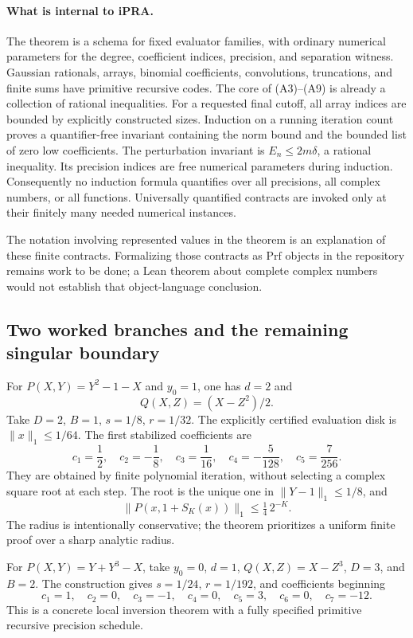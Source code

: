 \paragraph{What is internal to iPRA.}
The theorem is a schema for fixed evaluator families, with ordinary
numerical parameters for the degree, coefficient indices, precision,
and separation witness. Gaussian rationals, arrays, binomial
coefficients, convolutions, truncations, and finite sums have primitive
recursive codes. The core of (A3)--(A9) is already a collection of
rational inequalities. For a requested final cutoff, all array indices
are bounded by explicitly constructed sizes. Induction on a running
iteration count proves a quantifier-free invariant containing the norm
bound and the bounded list of zero low coefficients. The perturbation
invariant is \(E_n\leq2m\delta\), a rational inequality. Its precision
indices are free numerical parameters during induction. Consequently
no induction formula quantifies over all precisions, all complex
numbers, or all functions. Universally quantified contracts are invoked
only at their finitely many needed numerical instances.

The notation involving represented values in the theorem is an
explanation of these finite contracts. Formalizing those contracts as
\(\mathrm{Prf}\) objects in the repository remains work to be done; a
Lean theorem about complete complex numbers would not establish that
object-language conclusion.

\subsection{Two worked branches and the remaining singular boundary}

For \(P(X,Y)=Y^2-1-X\) and \(y_0=1\), one has \(d=2\) and
\[
 Q(X,Z)=(X-Z^2)/2.
\]
Take \(D=2\), \(B=1\), \(s=1/8\), \(r=1/32\). The explicitly
certified evaluation disk is \(\lVert x\rVert_1\leq1/64\). The
first stabilized coefficients are
\[
 c_1=\frac12,\quad c_2=-\frac18,\quad c_3=\frac1{16},
 \quad c_4=-\frac5{128},\quad c_5=\frac7{256}.
\]
They are obtained by finite polynomial iteration, without selecting a
complex square root at each step. The root is the unique one in
\(\lVert Y-1\rVert_1\leq1/8\), and
\[
 \lVert P(x,1+S_K(x))\rVert_1\leq\tfrac14\,2^{-K}.
\]
The radius is intentionally conservative; the theorem prioritizes a
uniform finite proof over a sharp analytic radius.

For \(P(X,Y)=Y+Y^3-X\), take \(y_0=0\), \(d=1\),
\(Q(X,Z)=X-Z^3\), \(D=3\), and \(B=2\). The construction gives
\(s=1/24\), \(r=1/192\), and coefficients beginning
\[
  c_1=1,\quad c_2=0,\quad c_3=-1,\quad c_4=0,
  \quad c_5=3,\quad c_6=0,\quad c_7=-12.
\]
This is a concrete local inversion theorem with a fully specified
primitive recursive precision schedule.

